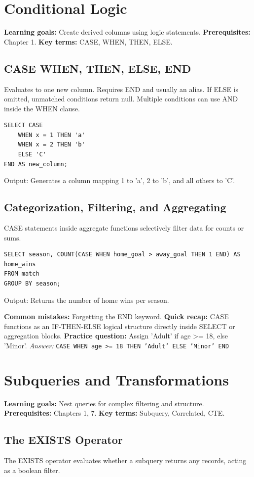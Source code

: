 \documentclass[12pt, a4paper]{article}
\begin{document}
\section{Conditional Logic}
\textbf{Learning goals:} Create derived columns using logic statements.
\textbf{Prerequisites:} Chapter 1.
\textbf{Key terms:} CASE, WHEN, THEN, ELSE.

\subsection{CASE WHEN, THEN, ELSE, END}
Evaluates to one new column. Requires END and usually an alias. If ELSE is omitted, unmatched conditions return null. Multiple conditions can use AND inside the WHEN clause.

\begin{verbatim}
SELECT CASE 
    WHEN x = 1 THEN 'a' 
    WHEN x = 2 THEN 'b' 
    ELSE 'C' 
END AS new_column;
\end{verbatim}
Output: Generates a column mapping 1 to 'a', 2 to 'b', and all others to 'C'.

\subsection{Categorization, Filtering, and Aggregating}
CASE statements inside aggregate functions selectively filter data for counts or sums.

\begin{verbatim}
SELECT season, COUNT(CASE WHEN home_goal > away_goal THEN 1 END) AS home_wins 
FROM match 
GROUP BY season;
\end{verbatim}
Output: Returns the number of home wins per season.

\textbf{Common mistakes:} Forgetting the END keyword.
\textbf{Quick recap:} CASE functions as an IF-THEN-ELSE logical structure directly inside SELECT or aggregation blocks.
\textbf{Practice question:} Assign 'Adult' if age >= 18, else 'Minor'.
\textit{Answer:} \texttt{CASE WHEN age >= 18 THEN 'Adult' ELSE 'Minor' END}

\section{Subqueries and Transformations}
\textbf{Learning goals:} Nest queries for complex filtering and structure.
\textbf{Prerequisites:} Chapters 1, 7.
\textbf{Key terms:} Subquery, Correlated, CTE.

\subsection{The EXISTS Operator}
The EXISTS operator evaluates whether a subquery returns any records, acting as a boolean filter.
\end{document}

